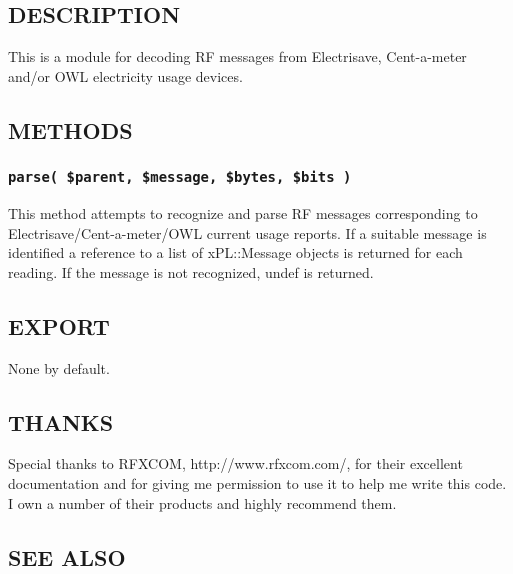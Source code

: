 \subsection*{DESCRIPTION\label{xPL::RF::Electrisave_DESCRIPTION}}


This is a module for decoding RF messages from Electrisave,
Cent-a-meter and/or OWL electricity usage devices.

\subsection*{METHODS\label{xPL::RF::Electrisave_METHODS}}
\subsubsection*{\texttt{parse( \$parent, \$message, \$bytes, \$bits )}\label{xPL::RF::Electrisave_parse_parent_message_bytes_bits_}}


This method attempts to recognize and parse RF messages corresponding
to Electrisave/Cent-a-meter/OWL current usage reports.  If a suitable
message is identified a reference to a list of xPL::Message objects is
returned for each reading.  If the message is not recognized, undef is
returned.

\subsection*{EXPORT\label{xPL::RF::Electrisave_EXPORT}}


None by default.

\subsection*{THANKS\label{xPL::RF::Electrisave_THANKS}}


Special thanks to RFXCOM, \textsf{http://www.rfxcom.com/}, for their
excellent documentation and for giving me permission to use it to help
me write this code.  I own a number of their products and highly
recommend them.

\subsection*{SEE ALSO\label{xPL::RF::Electrisave_SEE_ALSO}}


